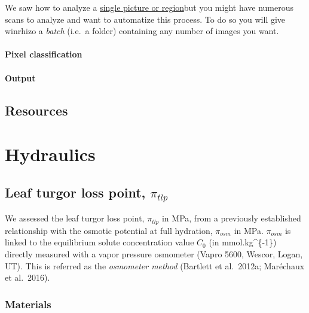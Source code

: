 \documentclass[
  12pt,
  american,
  a4paper,
  extrafontsizes,onecolumn,openright
  ]{memoir}
\begin{document}
We saw how to analyze a \protect\hyperlink{first-analysis}{single picture or region}but you might have numerous scans to analyze and want to automatize this process. To do so you will give winrhizo a \emph{batch} (i.e.~a folder) containing any number of images you want.

\hypertarget{pixel-classification}{%
\subsubsection{Pixel classification}\label{pixel-classification}}

\hypertarget{output}{%
\subsubsection{Output}\label{output}}

\hypertarget{resources}{%
\section{Resources}\label{resources}}

\hypertarget{hydraulics}{%
\chapter{Hydraulics}\label{hydraulics}}

\hypertarget{leaf-turgor-loss-point-pi_tlp}{%
\section{\texorpdfstring{Leaf turgor loss point, \(\pi_{tlp}\)}{Leaf turgor loss point, \textbackslash pi\_\{tlp\}}}\label{leaf-turgor-loss-point-pi_tlp}}

We assessed the leaf turgor loss point, \(\pi_{tlp}\) in MPa, from a previously established relationship with the osmotic potential at full hydration, \(\pi_{osm}\) in MPa. \(\pi_{osm}\) is linked to the equilibrium solute concentration value \(C_0\) (in mmol.kg\^{}\{-1\}) directly measured with a vapor pressure osmometer (Vapro 5600, Wescor, Logan, UT). This is referred as the \emph{osmometer method} (Bartlett et al.~2012a; Maréchaux et al.~2016).

\hypertarget{materials}{%
\subsection{Materials}\label{materials}}
\end{document}
